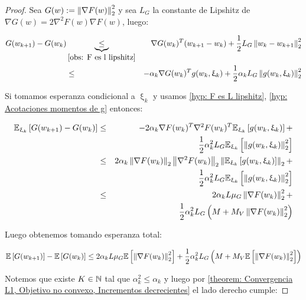 \begin{proof}
	Sea $G(w) := \left\lVert\nabla F(w)\right\rVert_2^2$ y sea $L_G$ la constante de Lipshitz de $\nabla G(w) = 2 \nabla^2 F(w) \nabla F(w)$, luego:
	
	\begin{equation*}
	\begin{aligned}
		G(w_{k+1}) - G(w_k) & \underbrace{\leq}_{\ref{obs: F es l lipshitz}} & \nabla G(w_k)^T (w_{k+1} - w_k) + \frac{1}{2} L_G \left\lVert w_k - w_{k+1}\right\rVert_2^2 \\
		& \leq & - \alpha_k \nabla G(w_k)^T g(w_k, \upxi_{k}) + \frac{1}{2} \alpha_k L_G  \left\lVert g(w_k, \upxi_{k})\right\rVert_2^2
	\end{aligned}
	\end{equation*}
	
	Si tomamos esperanza condicional a $\upxi_{k}$ y usamos \ref{hyp: F es L lipshitz}, \ref{hyp: Acotaciones momentos de g} entonces:
	
	\begin{equation*}
	\begin{aligned}
	\mathbb{E}_{\upxi_{k}} \left[G(w_{k+1}) - G(w_k)\right] & \leq & -2 \alpha_k \nabla F(w_k)^T \nabla^2 F(w_k)^T \mathbb{E}_{\upxi_{k}} \left[g(w_k, \upxi_{k})\right] + \\
	&& \frac{1}{2} \alpha_k^2 L_G \mathbb{E}_{\upxi_{k}} \left[\left\lVert g(w_k, \upxi_{k})\right\rVert^2_2\right] \\
	& \leq & 2 \alpha_k \left\lVert\nabla F(w_k)\right\rVert_2 \left\lVert\nabla^2 F(w_k)\right\rVert_2 \left\lVert\mathbb{E}_{\upxi_{k}} \left[g(w_k, \upxi_{k})\right]\right\rVert_2 +  \\
	&& \frac{1}{2} \alpha_k^2 L_G \mathbb{E}_{\upxi_{k}} \left[\left\lVert g(w_k, \upxi_{k})\right\rVert^2_2\right] \\
	& \leq & 2 \alpha_k L \mu_G \left\lVert\nabla F (w_k)\right\rVert_2^2 + \\
	 && \frac{1}{2} \alpha_k^2 L_G\left(M + M_V \left\lVert\nabla F(w_k)\right\rVert_2^2\right)
	\end{aligned}
	\end{equation*}
	
	Luego obtenemos tomando esperanza total:
	
	\begin{equation}
	\label{eq: Objetivo no convexo regular, Incrementos decrecientes}
	\mathbb{E} \left[G(w_{k+1})\right] - \mathbb{E} \left[G(w_k)\right] \leq 2 \alpha_k L \mu_G \mathbb{E} \left[\left\lVert\nabla F (w_k)\right\rVert_2^2\right] +  \frac{1}{2} \alpha_k^2 L_G\left(M + M_V \mathbb{E} \left[\left\lVert\nabla F(w_k)\right\rVert_2^2\right]\right)
	\end{equation}
	
	Notemos que existe $K\in {\mathbb{N}}$ tal que $\alpha_k^2 \leq \alpha_k$ y luego por \ref{theorem: Convergencia L1, Objetivo no convexo, Incrementos decrecientes} el lado derecho cumple:
	

\end{proof}
